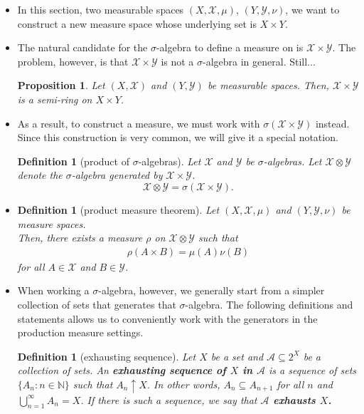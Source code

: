 \documentclass[10pt]{article}
\newtheorem{definition}[lemma]{Definition}
\newtheorem{proposition}[lemma]{Proposition}
\numberwithin{lemma}{section}
\newcommand{\mcal}[1]{\mathcal{#1}}
\newcommand{\Nat}{\mathbb{N}}
\begin{document}
\begin{itemize}
  \item In this section, two measurable spaces $(X, \mcal{X}, \mu)$, $(Y, \mcal{Y}, \nu)$, we want to construct a new measure space whose underlying set is $X \times Y$.

  \item The natural candidate for the $\sigma$-algebra to define a measure on is $\mcal{X} \times \mcal{Y}$. The problem, however, is that $\mcal{X} \times \mcal{Y}$ is not a $\sigma$-algebra in general. Still...
  
  \begin{proposition}
    Let $(X,\mcal{X})$ and $(Y,\mcal{Y})$ be measurable spaces. Then, $\mcal{X} \times \mcal{Y}$ is a semi-ring on $X \times Y$.
  \end{proposition}

  \item As a result, to construct a measure, we must work with $\sigma(\mcal{X} \times \mcal{Y})$ instead. Since this construction is very common, we will give it a special notation.
  
  \begin{definition}[product of $\sigma$-algebras]
    Let $\mcal{X}$ and $\mcal{Y}$ be $\sigma$-algebras. Let $\mcal{X} \otimes \mcal{Y}$ denote the $\sigma$-algebra generated by $\mcal{X} \times \mcal{Y}$.
    $$ \mcal{X} \otimes \mcal{Y} = \sigma(\mcal{X} \times \mcal{Y}). $$
  \end{definition}

  \item \begin{definition}[product measure theorem]
    Let $(X, \mcal{X}, \mu)$ and $(Y, \mcal{Y}, \nu)$ be measure spaces.\\
    Then, there exists a measure $\rho$ on $\mcal{X} \otimes \mcal{Y}$ such that
    \begin{align*}
      \rho(A \times B) = \mu(A) \nu(B)
    \end{align*}
    for all $A \in \mcal{X}$ and $B \in \mcal{Y}$. 
  \end{definition}

  \item When working a $\sigma$-algebra, however, we generally start from a simpler collection of sets that generates that $\sigma$-algebra. The following definitions and statements allows us to conveniently work with the generators in the production measure settings.
  
  \begin{definition}[exhausting sequence]
    Let $X$ be a set and $\mcal{A} \subseteq 2^X$ be a collection of sets. An {\bf exhausting sequence of $X$ in $\mcal{A}$} is a sequence of sets $\{ A_n : n \in \Nat \}$ such that $A_n \uparrow X$. In other words, $A_n \subseteq A_{n+1}$ for all $n$ and $\bigcup_{n=1}^\infty A_n = X$. If there is such a sequence, we say that {\bf $\mcal{A}$ exhausts $X$.}
  \end{definition}
  

\end{itemize}
\end{document}
